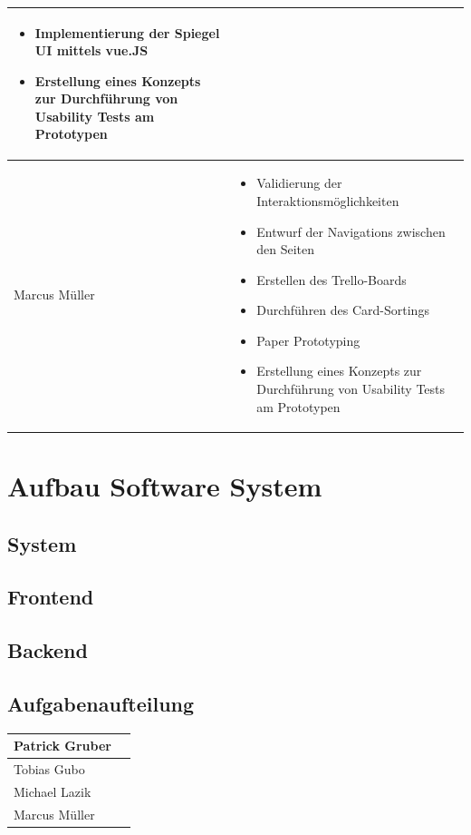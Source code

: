\documentclass[12pt, a4paper]{scrartcl}
\begin{document}
\begin{tabularx}{0.95\textwidth}{|l|X|}
\begin{itemize}
			\item Implementierung der Spiegel UI mittels vue.JS
			\item Erstellung eines Konzepts zur Durchführung von Usability Tests am Prototypen
		\end{itemize}\\
		\hline
		Marcus Müller &  \begin{itemize}
			\setlength{\itemsep}{-0.5em}
			\item  Validierung der Interaktionsmöglichkeiten
			\item  Entwurf der Navigations zwischen den Seiten
			\item Erstellen des Trello-Boards
			\item Durchführen des Card-Sortings
			\item Paper Prototyping
			\item Erstellung eines Konzepts zur Durchführung von Usability Tests am Prototypen
		\end{itemize}\\
		\hline
	\end{tabularx}
	
	\newpage
	
	\section{Aufbau Software System}
	\subsection{System}
	\subsection{Frontend}
	\subsection{Backend}
	
	\subsection*{Aufgabenaufteilung}
	\begin{tabularx}{0.95\textwidth}{|l|X|}
		\hline
		Patrick Gruber & \\
		\hline
		Tobias Gubo & \\
		\hline
		Michael Lazik & \\
		\hline
		Marcus Müller & \\
		\hline
	\end{tabularx}
	
\end{document}
